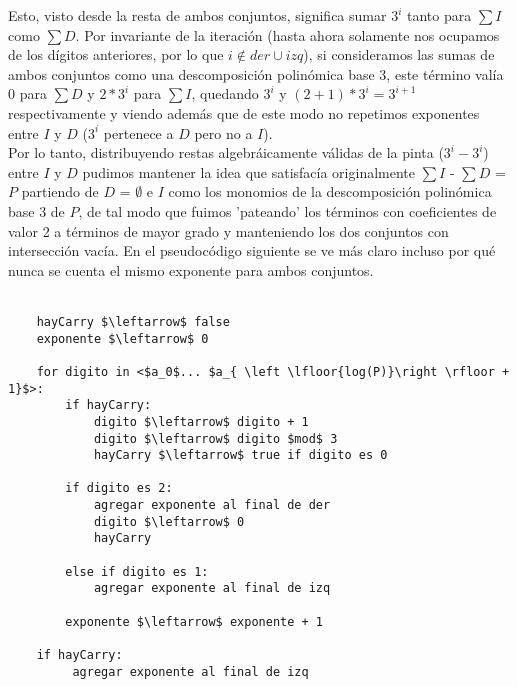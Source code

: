 	Esto, visto desde la resta de ambos conjuntos, significa sumar $3^{i}$ tanto para $\sum I$ como $\sum D$. Por invariante de la iteración (hasta ahora solamente nos ocupamos de los dígitos anteriores, por lo que $i \notin der \cup izq$), si consideramos las sumas de ambos conjuntos como una descomposición polinómica base 3, este término valía 0 para $\sum D$ y $2*3^{i}$ para $\sum I$, quedando $3^{i}$ y $(2+1)*3^{i} = 3^{i+1}$ respectivamente y viendo además que de este modo no repetimos exponentes entre $I$ y $D$ ($3^i$ pertenece a $D$ pero no a $I$).
	\\
	
	Por lo tanto, distribuyendo restas algebráicamente válidas de la pinta ($3^{i}-3^{i}$) entre $I$ y $D$ pudimos mantener la idea que satisfacía originalmente $\sum I$ - $\sum D$ = $P$ partiendo de $D$ = $\emptyset$ e $I$ como los monomios de la descomposición polinómica base 3 de $P$, de tal modo que fuimos 'pateando' los términos con coeficientes de valor 2 a términos de mayor grado y manteniendo los dos conjuntos con intersección vacía. En el pseudocódigo siguiente se ve más claro incluso por qué nunca se cuenta el mismo exponente para ambos conjuntos.
\\
\\
\lstset{basicstyle=\large}
\begin{lstlisting}
    hayCarry $\leftarrow$ false				
    exponente $\leftarrow$ 0

    for digito in <$a_0$... $a_{ \left \lfloor{log(P)}\right \rfloor + 1}$>:
        if hayCarry:
            digito $\leftarrow$ digito + 1
            digito $\leftarrow$ digito $mod$ 3
            hayCarry $\leftarrow$ true if digito es 0

        if digito es 2:
            agregar exponente al final de der
            digito $\leftarrow$ 0
            hayCarry

        else if digito es 1:
            agregar exponente al final de izq

        exponente $\leftarrow$ exponente + 1

    if hayCarry:
         agregar exponente al final de izq

\end{lstlisting}

